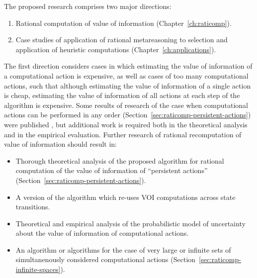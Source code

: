 The proposed research comprises two major directions:
\begin {enumerate}
\item Rational computation of value of information (Chapter~\ref{ch:raticomp}).
\item Case studies of application of rational metareasoning to
  selection and application of heuristic computations (Chapter~\ref{ch:applications}).
\end {enumerate}

The first direction considers cases in which estimating the value
of information of a computational action is expensive, as well as
cases of too many computational actions, such that although
estimating the value of information of a single action is cheap,
estimating the value of information of all actions at each step of the
algorithm is expensive. Some results of research of the case when
computational actions can be performed in any order
(Section~\ref{sec:raticomp-persistent-actions}) were published
\cite{TolpinShimony.raticomp}, but additional work is required both in
the theoretical analysis and in the empirical evaluation. Further
research of rational recomputation of value of information should
result in:
\begin{itemize}
\item Thorough theoretical analysis of the proposed algorithm for
rational computation of the value of information of ``persistent
actions'' (Section~\ref{sec:raticomp-persistent-actions}).
\item A version of the algorithm which re-uses VOI computations
across state transitions.
\item Theoretical and empirical analysis of the probabilistic model of
uncertainty about the value of information of computational actions.
\item An algorithm or algorithms for the case of very large or infinite
sets of simultanenously considered computational actions
(Section~\ref{sec:raticomp-infinite-spaces}).
\end{itemize}

